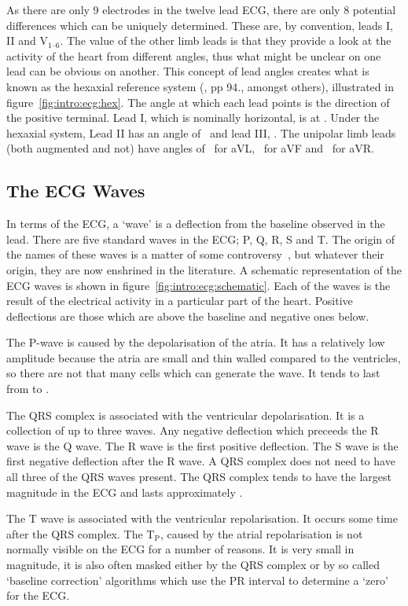 As there are only 9 electrodes in the twelve lead ECG, there are only 8
potential differences which can be uniquely determined.
These are, by convention, leads I, II and $\text{V}_{\text{1--6}}$.
The value of the other limb leads is that they provide a look at the activity of
the heart from different angles, thus what might be unclear on one lead can be
obvious on another.
This concept of lead angles creates what is known as the hexaxial reference
system (\cite{Lipman1994}, pp 94., amongst others), illustrated in
figure~\ref{fig:intro:ecg:hex}.
The angle at which each lead points is the direction of the positive terminal.
Lead I, which is nominally horizontal, is at .
Under the hexaxial system, Lead II has an angle of \ and lead III,
.
The unipolar limb leads (both augmented and not) have angles of \ for
aVL, \ for aVF and \ for aVR.

\subsection{The ECG Waves}

In terms of the ECG, a `wave' is a deflection from the baseline observed in the
lead.
There are five standard waves in the ECG; P, Q, R, S and T.
The origin of the names of these waves is a matter of some
controversy~\cite{Hurst1998}, but whatever their origin, they are now enshrined
in the literature.
A schematic representation of the ECG waves is shown in
figure~\ref{fig:intro:ecg:schematic}.
Each of the waves is the result of the electrical activity in a particular part
of the heart.
Positive deflections are those which are above the baseline and negative ones
below.

The P-wave is caused by the depolarisation of the atria.
It has a relatively low amplitude because the atria are small and thin walled
compared to the ventricles, so there are not that many cells which can generate
the wave.
It tends to last from  to .

The QRS complex is associated with the ventricular depolarisation.
It is a collection of up to three waves.
Any negative deflection which preceeds the R wave is the Q wave.
The R wave is the first positive deflection.
The S wave is the first negative deflection after the R wave.
A QRS complex does not need to have all three of the QRS waves present.
The QRS complex tends to have the largest magnitude in the ECG and lasts
approximately .

The T wave is associated with the ventricular repolarisation.
It occurs some time after the QRS complex.
The $\text{T}_{\text{P}}$, caused by the atrial repolarisation is not normally
visible on the ECG for a number of reasons.
It is very small in magnitude, it is also often masked either by the QRS complex
or by so called `baseline correction' algorithms which use the PR interval to
determine a `zero' for the ECG.

